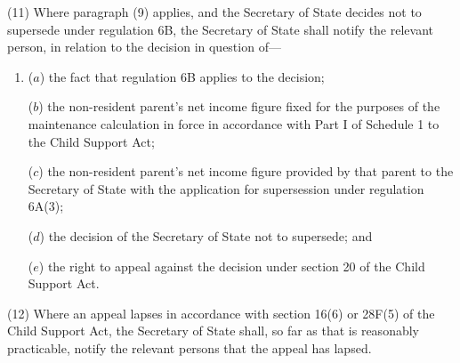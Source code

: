 \documentclass[12pt,a4paper]{article}
\begin{document}
(11) Where paragraph (9) applies, and the 
Secretary of State  %
decides not to supersede under regulation 6B, 
the Secretary of State  %
shall notify the relevant person, in relation to the decision in question of—
\begin{enumerate}\item[]
($a$) the fact that regulation 6B applies to the decision;

($b$) the non-resident parent’s net income figure fixed for the purposes of the maintenance calculation in force in accordance with Part I of Schedule 1 to the Child Support Act;

($c$) the non-resident parent’s net income figure provided by that parent to the 
Secretary of State  %
with the application for supersession under regulation 6A(3);

($d$) the decision of the 
Secretary of State  %
not to supersede; and

($e$) the right to appeal against the decision under section 20 of the Child Support Act.
\end{enumerate}

(12) Where an appeal lapses in accordance with section 16(6) or 28F(5) of the Child Support Act, the Secretary of State shall, so far as that is reasonably practicable, notify the relevant persons that the appeal has lapsed.

\end{document}
